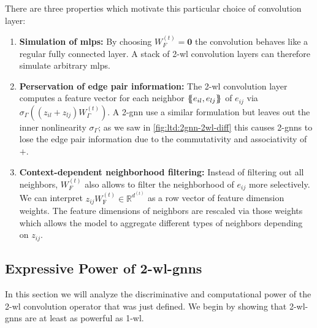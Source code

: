 There are three properties which motivate this particular choice of convolution layer:
\begin{enumerate}[label=\textbf{\arabic*.}]
	\item \textbf{Simulation of \acp{mlp}:}
		By choosing $W_{F}^{(t)} = \mathbf{0}$ the convolution behaves like a regular fully connected layer.
		A stack of 2-\acs{wl} convolution layers can therefore simulate arbitrary \acp{mlp}.
	\item \textbf{Perservation of edge pair information:}
		The 2-\acs{wl} convolution layer computes a feature vector for each neighbor $\ldblbrace e_{il}, e_{lj} \rdblbrace$ of $e_{ij}$ via $\sigma_{\Gamma}\left(\left( z_{il} + z_{lj} \right) W_{\Gamma}^{(t)} \right)$.
		A 2-\acs{gnn} use a similar formulation but leaves out the inner nonlinearity $\sigma_{\Gamma}$;
		as we saw in \cref{fig:ltd:2gnn-2wl-diff} this causes 2-\acsp{gnn} to lose the edge pair information due to the commutativity and associativity of $+$.
	\item \textbf{Context-dependent neighborhood filtering:}
		Instead of filtering out all neighbors, $W_{F}^{(t)}$ also allows to filter the neighborhood of $e_{ij}$ more selectively.
		We can interpret $z_{ij} W_{\mathrm{F}}^{(t)} \in \mathbb{R}^{d^{(t)}}$ as a row vector of feature dimension weights.
		The feature dimensions of neighbors are rescaled via those weights which allows the model to aggregate different types of neighbors depending on $z_{ij}$.
\end{enumerate}

\subsection{Expressive Power of 2-\acs*{wl}-\acsp*{gnn}}%
\label{sec:ltd:wl2gnn:properties}

In this section we will analyze the discriminative and computational power of the 2-\ac{wl} convolution operator that was just defined.
We begin by showing that 2-\acs{wl}-\acsp{gnn} are at least as powerful as 1-\acs{wl}.

